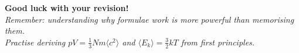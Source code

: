 \vspace{1cm}
\begin{center}
{\large\bfseries\color{cieprimary} Good luck with your revision!}\\[0.4cm]
\textit{Remember: understanding \emph{why} formulae work is more powerful than
memorising them.}\\
\textit{Practise deriving $pV = \tfrac{1}{3}Nm\langle c^2\rangle$ and
$\langle E_k\rangle = \tfrac{3}{2}kT$ from first principles.}
\end{center}

